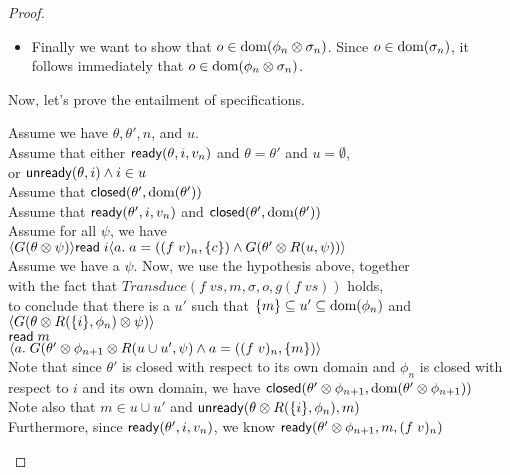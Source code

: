 \begin{proof}
\begin{itemize}
\item Finally we want to show that $o \in \mbox{dom}({\phi_n \otimes \sigma_n})$. Since $o \in \mbox{dom}({\sigma_n})$,
  it follows immediately that $o \in \mbox{dom}({\phi_n \otimes \sigma_n})$. 


\end{itemize}

Now, let's prove the entailment of specifications. 

\begin{tabbedproof}
\oo Assume we have $\theta, \theta', n$, and $u$. \\
\oo Assume that either $\mathsf{ready}({\theta}, {i}, {v_n})$ and $\theta = \theta'$ and $u = \emptyset$,  \\
\oo or $\mathsf{unready}({\theta}, {i}) \land i \in u$ \\
\oo Assume that $\mathsf{closed}({\theta'}, {\mbox{dom}({\theta'})})$ \\
\oo Assume that $\mathsf{ready}({\theta'}, {i}, {v_n})$ and $\mathsf{closed}({\theta'}, {\mbox{dom}({\theta'})})$ \\
\oo Assume for all $\psi$, we have \\
\ox  $\langle{G(\theta \otimes \psi)}\rangle{\mathsf{read}\;i}\langle{a}.\;{a = ((f\;v)_n, \{{c}\}) 
      \land G(\theta' \otimes R(u,\psi)) }\rangle$ \\
\oo Assume we have a $\psi$. Now, we use the hypothesis above, together \\
\oo with the fact that $\mathit{Transduce}(f\;vs, m, \sigma, o, g(f\;vs))$ holds, \\
\oo to conclude that there is a $u'$ such that $\{{m}\} \subseteq u' \subseteq \mbox{dom}({\phi_n})$ and \\
\ox $\left<G(\theta \otimes R(\{{i}\}, \phi_n) \otimes \psi)\right>$ \\
\ox $\mathsf{read}\; m$ \\
\ox $\left<a.\;G(\theta' \otimes \phi_{n+1} \otimes R(u \cup u',\psi)
             \land  a = ((f\;v)_n, \{{m}\})\right>$ \\
\oo Note that since $\theta'$ is closed with respect to its own domain and $\phi_n$ is closed with \\
\oo respect to $i$ and its own domain, we have $\mathsf{closed}({\theta' \otimes \phi_{n+1}}, {\mbox{dom}({\theta' \otimes \phi_{n+1}})})$ \\
\oo Note also that $m \in u \cup u'$ and $\mathsf{unready}({\theta \otimes R(\{{i}\}, \phi_n)}, {m})$ \\
\oo Furthermore, since $\mathsf{ready}({\theta'}, {i}, {v_n})$, we know $\mathsf{ready}({\theta' \otimes \phi_{n+1}}, {m}, {(f\;v)_n})$ \\

\end{tabbedproof}
\end{proof}
